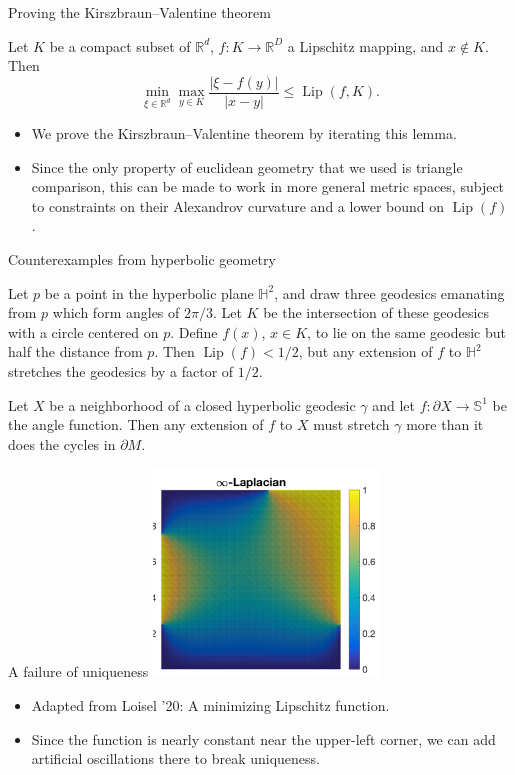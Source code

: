 \documentclass[10pt]{beamer}
\newcommand{\RR}{\mathbb{R}}
\DeclareMathOperator{\Lip}{Lip}
\begin{document}
\begin{frame}{Proving the Kirszbraun--Valentine theorem}
\begin{lemma}
Let $K$ be a compact subset of $\RR^d$, $f: K \to \RR^D$ a Lipschitz mapping, and $x \notin K$.
Then
$$\min_{\xi \in \RR^d} \max_{y \in K} \frac{|\xi - f(y)|}{|x - y|} \leq \Lip(f, K).$$
\end{lemma} 

\begin{itemize}
\item We prove the Kirszbraun--Valentine theorem by iterating this lemma. 
\item Since the only property of euclidean geometry that we used is triangle comparison, this can be made to work in more general metric spaces, subject to constraints on their Alexandrov curvature and a lower bound on $\Lip(f)$.
\end{itemize}
\end{frame}

\begin{frame}{Counterexamples from hyperbolic geometry}
\begin{example}
Let $p$ be a point in the hyperbolic plane $\mathbb H^2$, and draw three geodesics emanating from $p$ which form angles of $2\pi/3$.
Let $K$ be the intersection of these geodesics with a circle centered on $p$.
Define $f(x)$, $x \in K$, to lie on the same geodesic but half the distance from $p$.
Then $\Lip(f) < 1/2$, but any extension of $f$ to $\mathbb H^2$ stretches the geodesics by a factor of $1/2$.
\end{example}

\begin{example}
Let $X$ be a neighborhood of a closed hyperbolic geodesic $\gamma$ and let $f: \partial X \to \mathbb S^1$ be the angle function.
Then any extension of $f$ to $X$ must stretch $\gamma$ more than it does the cycles in $\partial M$.
\end{example}
\end{frame}

\begin{frame}{A failure of uniqueness}
    \centering 
    \includegraphics[width=6cm]{KirszbraunValentine.png}
    
\begin{itemize}
\item Adapted from Loisel '20: A minimizing Lipschitz function.  
\item Since the function is nearly constant near the upper-left corner, we can add artificial oscillations there to break uniqueness.
\end{itemize}
\end{frame}
\end{document}
